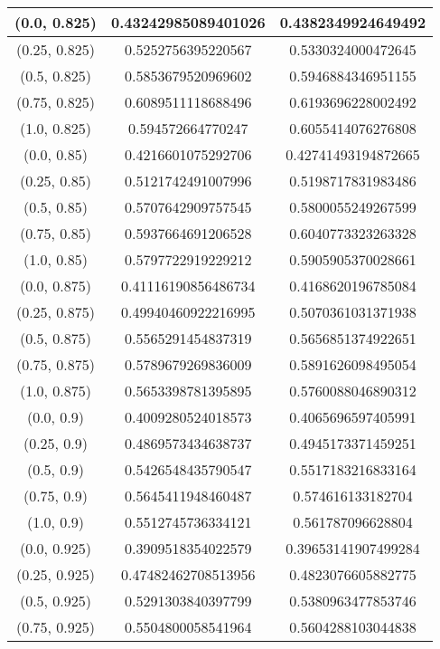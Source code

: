 \begin{table}[H]
\begin{tabular}{|c|c|c|}
\hline
(0.0, 0.825) & 0.43242985089401026 & 0.4382349924649492 \\
\hline
(0.25, 0.825) & 0.5252756395220567 & 0.5330324000472645 \\
\hline
(0.5, 0.825) & 0.5853679520969602 & 0.5946884346951155 \\
\hline
(0.75, 0.825) & 0.6089511118688496 & 0.6193696228002492 \\
\hline
(1.0, 0.825) & 0.594572664770247 & 0.6055414076276808 \\
\hline
\hline
(0.0, 0.85) & 0.4216601075292706 & 0.42741493194872665 \\
\hline
(0.25, 0.85) & 0.5121742491007996 & 0.5198717831983486 \\
\hline
(0.5, 0.85) & 0.5707642909757545 & 0.5800055249267599 \\
\hline
(0.75, 0.85) & 0.5937664691206528 & 0.6040773323263328 \\
\hline
(1.0, 0.85) & 0.5797722919229212 & 0.5905905370028661 \\
\hline
\hline
(0.0, 0.875) & 0.41116190856486734 & 0.4168620196785084 \\
\hline
(0.25, 0.875) & 0.49940460922216995 & 0.5070361031371938 \\
\hline
(0.5, 0.875) & 0.5565291454837319 & 0.5656851374922651 \\
\hline
(0.75, 0.875) & 0.5789679269836009 & 0.5891626098495054 \\
\hline
(1.0, 0.875) & 0.5653398781395895 & 0.5760088046890312 \\
\hline
\hline
(0.0, 0.9) & 0.4009280524018573 & 0.4065696597405991 \\
\hline
(0.25, 0.9) & 0.4869573434638737 & 0.4945173371459251 \\
\hline
(0.5, 0.9) & 0.5426548435790547 & 0.5517183216833164 \\
\hline
(0.75, 0.9) & 0.5645411948460487 & 0.574616133182704 \\
\hline
(1.0, 0.9) & 0.5512745736334121 & 0.561787096628804 \\
\hline
\hline
(0.0, 0.925) & 0.3909518354022579 & 0.39653141907499284 \\
\hline
(0.25, 0.925) & 0.47482462708513956 & 0.4823076605882775 \\
\hline
(0.5, 0.925) & 0.5291303840397799 & 0.5380963477853746 \\
\hline
(0.75, 0.925) & 0.5504800058541964 & 0.5604288103044838 \\

\end{tabular}
\end{table}
